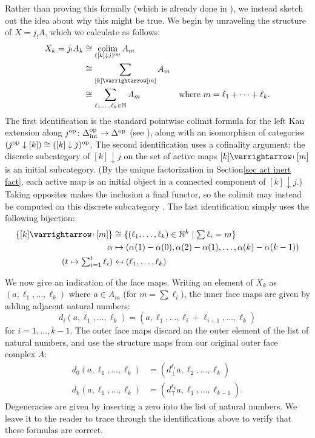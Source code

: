 \documentclass{amsart}
\theoremstyle{definition}
\theoremstyle{remark}
\newcommand{\op}{\textup{op}}
\newcommand{\intrm}{\textup{int}}
\newcommand{\delint}{\Delta_\intrm}
\DeclareMathOperator*{\colim}{colim}
\newcommand{\ract}{\varrightarrow\mapsfromchar}
\begin{document}
Rather than proving this formally (which is already done in \cite{HackneyKock:FDS}), we instead sketch out the idea about why this might be true.
We begin by unraveling the structure of $X = j_!A$, which we calculate as follows:
\begin{align*}
X_k = j_!A_k &\cong \colim_{([k] \downarrow j)^\op} A_m \\
&\cong\sum_{ [k] \ract [m]} A_m \\
&\cong \sum_{\ell_1, \dots, \ell_k \in \mathbb{N}} A_m & \text{where } m= \ell_1 + \dots + \ell_k.
\end{align*}
The first identification is the standard pointwise colimit formula for the left Kan extension along $j^\op \colon \delint^\op \to \Delta^\op$ (see \cite[X.3]{MacLane:CWM}), along with an isomorphism of categories $(j^\op \downarrow [k]) \cong ([k] \downarrow j)^\op$.
The second identification uses a cofinality argument: the discrete subcategory of $[k] \downarrow j$ on the set of active maps $[k] \ract [m]$ is an initial subcategory. (By the unique factorization in Section\nobreakspace \ref {sec act inert fact}, each active map is an initial object in a connected component of $[k] \downarrow j$.)
Taking opposites makes the inclusion a final functor, so the colimit may instead be computed on this discrete subcategory \cite[IX.3]{MacLane:CWM}.
The last identification simply uses the following bijection:
\begin{align*}
\{ [k] \ract [m] \}  &\cong \{ (\ell_1, \dots, \ell_k) \in \mathbb{N}^k \mid \textstyle  \sum \ell_i = m \} \\
\alpha   &\mapsto (\alpha(1) - \alpha(0), \alpha(2) - \alpha(1), \dots, \alpha(k) - \alpha(k-1)) \\
\textstyle  ( t \mapsto \sum_{i=1}^t \ell_i ) &\mapsfrom (\ell_1, \dots, \ell_k) 
\end{align*}

We now give an indication of the face maps.
Writing an element of $X_k$ as $(a, \ell_1, \dots, \ell_k)$ where $a\in A_m$ (for $m = \sum \ell_i$), the inner face maps are given by adding adjacent natural numbers:
\[
  d_i(a, \ell_1, \dots, \ell_k) = (a, \ell_1, \dots, \ell_i + \ell_{i+1}, \dots, \ell_k) 
\]
for $i=1, \dots, k-1$.
The outer face maps discard an the outer element of the list of natural numbers, and use the structure maps from our original outer face complex $A$:
\begin{align*}
  d_0(a, \ell_1, \dots, \ell_k) &= (d_\bot^{\ell_1} a, \ell_2, \dots, \ell_k) \\
  d_k(a, \ell_1, \dots, \ell_k) &= (d_\top^{\ell_k} a, \ell_1, \dots, \ell_{k-1}).
\end{align*}
Degeneracies are given by inserting a zero into the list of natural numbers.
We leave it to the reader to trace through the identifications above to verify that these formulas are correct.
\end{document}
